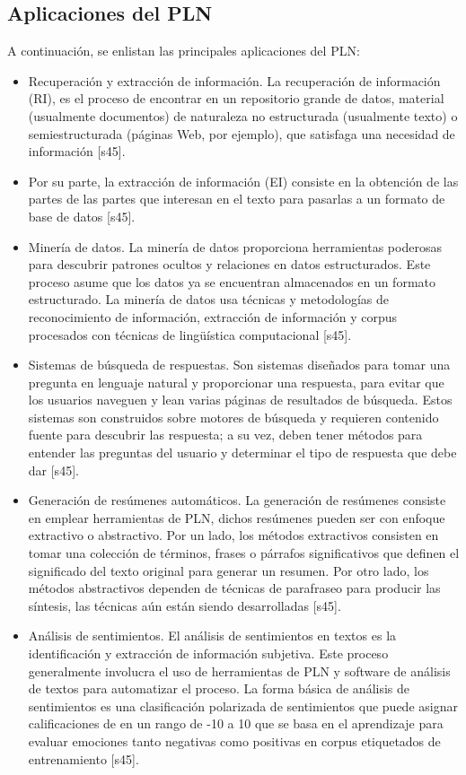 \subsection{Aplicaciones del PLN}
A continuación, se enlistan las principales aplicaciones del PLN:
\begin{itemize}
    \item Recuperación y extracción de información. La recuperación de información (RI), es el proceso de encontrar en un repositorio grande de datos, material (usualmente documentos) de naturaleza no estructurada (usualmente texto) o semiestructurada (páginas Web, por ejemplo), que satisfaga una necesidad de información [s45].
    \item Por su parte, la extracción de información (EI) consiste en la obtención de las partes de las partes que interesan en el texto para pasarlas a un formato de base de datos [s45].
    \item Minería de datos. La minería de datos proporciona herramientas poderosas para descubrir patrones ocultos y relaciones en datos estructurados. Este proceso asume que los datos ya se encuentran almacenados en un formato estructurado. La minería de datos usa técnicas y metodologías de reconocimiento de información, extracción de información y corpus procesados con técnicas de lingüística computacional [s45].
    \item Sistemas de búsqueda de respuestas. Son sistemas diseñados para tomar una pregunta en lenguaje natural y proporcionar una respuesta, para evitar que los usuarios naveguen y lean varias páginas de resultados de búsqueda. Estos sistemas son construidos sobre motores de búsqueda y requieren contenido fuente para descubrir las respuesta; a su vez, deben tener métodos para entender las preguntas del usuario y determinar el tipo de respuesta que debe dar [s45].
    \item Generación de resúmenes automáticos. La generación de resúmenes consiste en emplear herramientas de PLN, dichos resúmenes pueden ser con enfoque extractivo o abstractivo. Por un lado, los métodos extractivos consisten en tomar una colección de términos, frases o párrafos significativos que definen el significado del texto original para generar un resumen. Por otro lado, los métodos abstractivos dependen de técnicas de parafraseo para producir las síntesis, las técnicas aún están siendo desarrolladas [s45].
    \item Análisis de sentimientos. El análisis de sentimientos en textos es la identificación y extracción de información subjetiva. Este proceso generalmente involucra el uso de herramientas de PLN y software de análisis de textos para automatizar el proceso. La forma básica de análisis de sentimientos es una clasificación polarizada de sentimientos que puede asignar calificaciones de en un rango de -10 a 10 que se basa en el aprendizaje para evaluar emociones tanto negativas como positivas en corpus etiquetados de entrenamiento [s45].

\end{itemize}
